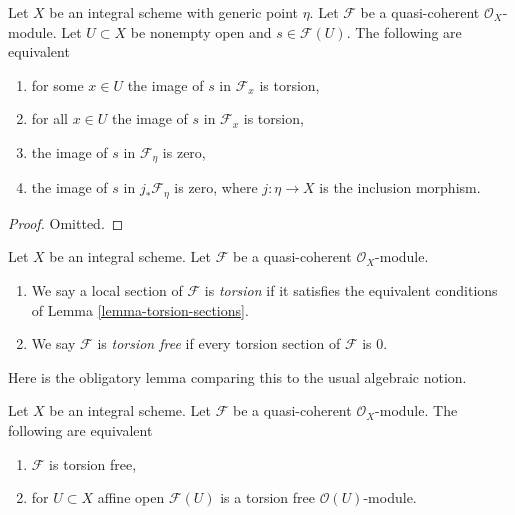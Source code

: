 \begin{lemma}
\label{lemma-torsion-sections}
Let $X$ be an integral scheme with generic point $\eta$. Let $\mathcal{F}$
be a quasi-coherent $\mathcal{O}_X$-module. Let $U \subset X$ be nonempty
open and $s \in \mathcal{F}(U)$. The following are equivalent
\begin{enumerate}
\item for some $x \in U$ the image of $s$ in $\mathcal{F}_x$ is torsion,
\item for all $x \in U$ the image of $s$ in $\mathcal{F}_x$ is torsion,
\item the image of $s$ in $\mathcal{F}_\eta$ is zero,
\item the image of $s$ in $j_*\mathcal{F}_\eta$ is zero, where $j : \eta \to X$
is the inclusion morphism.
\end{enumerate}
\end{lemma}

\begin{proof}
Omitted.
\end{proof}

\begin{definition}
\label{definition-torsion}
Let $X$ be an integral scheme. Let $\mathcal{F}$ be a quasi-coherent
$\mathcal{O}_X$-module.
\begin{enumerate}
\item We say a local section of $\mathcal{F}$ is {\it torsion}
if it satisfies the equivalent conditions of Lemma \ref{lemma-torsion-sections}.
\item We say $\mathcal{F}$ is {\it torsion free} if every torsion section
of $\mathcal{F}$ is $0$.
\end{enumerate}
\end{definition}

\noindent
Here is the obligatory lemma comparing this to the usual algebraic notion.

\begin{lemma}
\label{lemma-check-torsion-on-affines}
Let $X$ be an integral scheme. Let $\mathcal{F}$ be a quasi-coherent
$\mathcal{O}_X$-module. The following are equivalent
\begin{enumerate}
\item $\mathcal{F}$ is torsion free,
\item for $U \subset X$ affine open $\mathcal{F}(U)$
is a torsion free $\mathcal{O}(U)$-module.
\end{enumerate}
\end{lemma}

